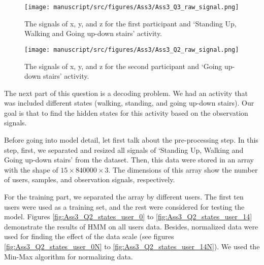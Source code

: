 \begin{figure}[H]
    \centering
    \begin{minipage}[b]{1\textwidth}
        \texttt{[image: manuscript/src/figures/Ass3/Ass3\_Q3\_raw\_signal.png]}
    \end{minipage}
    \caption{The signals of x, y, and z for the first participant and ‘Standing Up, Walking and Going up-down stairs’ activity.}
    \label{fig:Ass3_Q3_raw_signal}
\end{figure}
\begin{figure}[H]
    \centering
    \begin{minipage}[b]{1\textwidth}
        \texttt{[image: manuscript/src/figures/Ass3/Ass3\_Q2\_raw\_signal.png]}
    \end{minipage}
    \caption{The signals of x, y, and z for the second participant and ‘Going up-down stairs’ activity.}
    \label{fig:Ass3_Q2_raw_signal}
\end{figure}

The next part of this question is a decoding problem. We had an activity that was included different states (walking, standing, and going up-down stairs). Our goal is that to find the hidden states for this activity based on the observation signals.

Before going into model detail, let first talk about the pre-processing step. In this step, first, we separated and resized all signals of ‘Standing  Up,  Walking and Going up-down stairs’ from the dataset. Then, this data were stored in an array with the shape of $15 \times 840000 \times 3$. The dimensions of this array show the number of users, samples, and observation signals, respectively.

For the training part, we separated the array by different users. The first ten users were used as a training set, and the rest were considered for testing the model. Figures \ref{fig:Ass3_Q2_states_user_0} to \ref{fig:Ass3_Q2_states_user_14} demonstrate the results of HMM on all users data. Besides, normalized data were used for finding the effect of the data scale (see figures \ref{fig:Ass3_Q2_states_user_0N} to \ref{fig:Ass3_Q2_states_user_14N}). We used the Min-Max algorithm for normalizing data.



